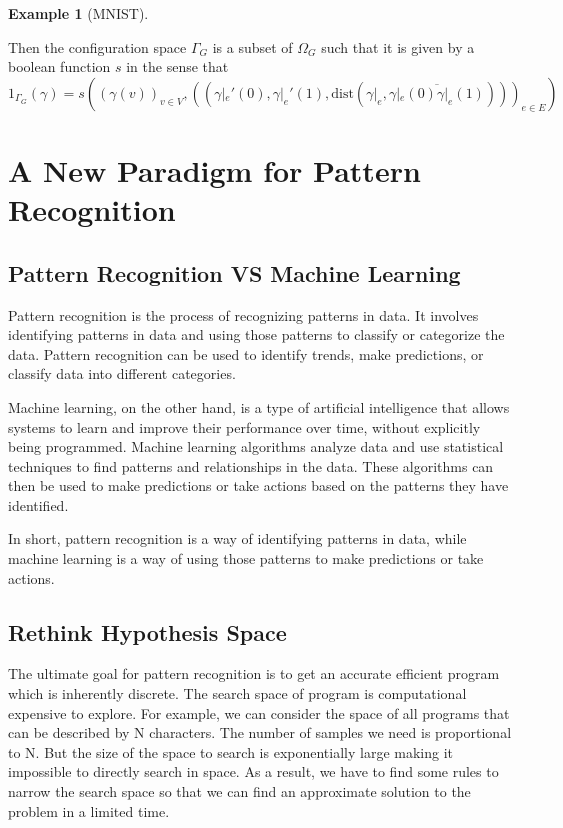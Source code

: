 \documentclass[11pt]{article} 	%
\theoremstyle{definition}
\newtheorem*{example}{Example}
\begin{document}
\begin{example}[MNIST]
\begin{itemize}
Then the configuration space $\Gamma_G$ is a subset of $\Omega_G$ such that it is given by a boolean function $s$ in the sense that
\begin{equation}
	1_{\Gamma_G}(\gamma)=s((\gamma(v))_{v\in V},((\gamma|_e'(0), \gamma|_e'(1), \text{dist}(\gamma|_e,\overline{\gamma|_e(0)\gamma|_e(1)})))_{e\in E})
\end{equation}
\end{itemize}
\end{example}
  
\section{A New Paradigm for Pattern Recognition }
\subsection{Pattern Recognition VS Machine Learning}

Pattern recognition is the process of recognizing patterns in data. It involves identifying patterns in data and using those patterns to classify or categorize the data. Pattern recognition can be used to identify trends, make predictions, or classify data into different categories.

Machine learning, on the other hand, is a type of artificial intelligence that allows systems to learn and improve their performance over time, without explicitly being programmed. Machine learning algorithms analyze data and use statistical techniques to find patterns and relationships in the data. These algorithms can then be used to make predictions or take actions based on the patterns they have identified.

In short, pattern recognition is a way of identifying patterns in data, while machine learning is a way of using those patterns to make predictions or take actions.


\subsection{Rethink Hypothesis Space}

The ultimate goal for pattern recognition is to get an accurate efficient program which is inherently discrete.  The search space of program is computational expensive to explore.  For example, we can consider the space of all programs that can be described by N characters. The number of samples we need is proportional to N. But the size of the space to search is exponentially large making it impossible to directly search in space.  As a result, we have to find some rules to narrow the search space so that we can find an approximate solution to the problem in a limited time. 
\end{document}
